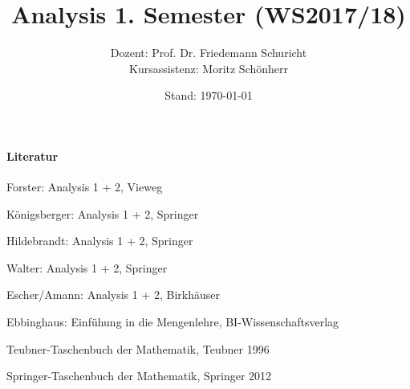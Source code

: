 \documentclass[11pt, oneside]{book}
\theoremstyle{break}
\theoremstyle{break}
\begin{document}
\title{\textbf{Analysis 1. Semester (WS2017/18)}}
\author{Dozent: Prof. Dr. Friedemann Schuricht\\
	Kursassistenz: Moritz Schönherr}
\date{Stand: \today}

\frontmatter
\maketitle
\tableofcontents

\newpage
\paragraph{Literatur}
\begin{compactitem}
	\item Forster: Analysis 1 + 2, Vieweg
	\item Königsberger: Analysis 1 + 2, Springer
	\item Hildebrandt: Analysis 1 + 2, Springer
	\item Walter: Analysis 1 + 2, Springer
	\item Escher/Amann: Analysis 1 + 2, Birkhäuser
	\item Ebbinghaus: Einfühung in die Mengenlehre, BI-Wissenschaftsverlag
	\item Teubner-Taschenbuch der Mathematik, Teubner 1996
	\item Springer-Taschenbuch der Mathematik, Springer 2012
\end{compactitem}

\mainmatter








%
%
%
%
%

\backmatter
\end{document}
